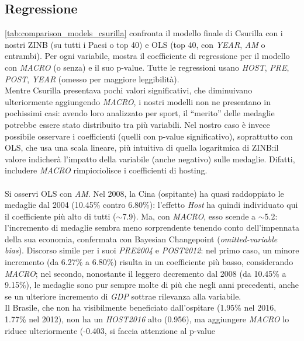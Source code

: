 \subsection{Regressione}\label{sec:results_regression}

\cref{tab:comparison_models_csurilla} confronta il modello finale di
Csurilla\cite{csurillaLessObviousEffect2023} con i nostri ZINB (su tutti i Paesi
o top 40) e OLS (top 40, con \textit{YEAR}, \textit{AM} o entrambi). Per ogni
variabile, mostra il coefficiente di regressione per il modello con
\textit{MACRO} (o senza) e il suo p-value. Tutte le regressioni usano
\textit{HOST}, \textit{PRE}, \textit{POST}, \textit{YEAR} (omesso per maggiore
leggibilità).\\
Mentre Csurilla presentava pochi valori significativi, che diminuivano
ulteriormente aggiungendo \textit{MACRO}, i nostri modelli non ne presentano in
pochissimi casi: avendo loro analizzato per sport, il ``merito'' delle medaglie
potrebbe essere stato distribuito tra più variabili. Nel nostro caso è invece
possibile osservare i coefficienti (quelli con p-value significativo),
soprattutto con OLS, che usa una scala lineare, più intuitiva di quella
logaritmica di ZINB:\@ il valore indicherà l'impatto della variabile (anche
negativo) sulle medaglie. Difatti, includere \textit{MACRO} rimpicciolisce i
coefficienti di hosting.\\
\\
Si osservi OLS con \textit{AM}. Nel 2008, la Cina (ospitante) ha quasi
raddoppiato le medaglie dal 2004 (10.45\% contro 6.80\%): l'effetto
\textit{Host} ha quindi individuato qui il coefficiente più alto di tutti
($\sim$7.9). Ma, con \textit{MACRO}, esso scende a $\sim$5.2: l'incremento di
medaglie sembra meno sorprendente tenendo conto dell'impennata della sua
economia, confermata con Bayesian Changepoint (\textit{omitted-variable bias}).
Discorso simile per i suoi \textit{PRE2004} e \textit{POST2012}: nel primo caso,
un minore incremento (da 6.27\% a 6.80\%) risulta in un coefficiente più basso,
considerando \textit{MACRO}; nel secondo, nonostante il leggero decremento dal
2008 (da 10.45\% a 9.15\%), le medaglie sono pur sempre molte di più che negli
anni precedenti, anche se un ulteriore incremento di \textit{GDP} sottrae
rilevanza alla variabile.\\
Il Brasile, che non ha visibilmente beneficiato dall'ospitare (1.95\% nel 2016,
1.77\% nel 2012), non ha un \textit{HOST2016} alto (0.956), ma aggiungere
\textit{MACRO} lo riduce ulteriormente (-0.403, si faccia attenzione al p-value
